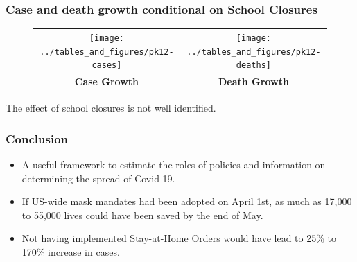 \documentclass{beamer}
\begin{document}
\begin{frame}
  \frametitle{Case and death growth conditional on \textbf{School Closures} }\vspace{-0.05cm}



\begin{figure}[ht]
  \begin{minipage}{\linewidth}
    \centering
    \begin{tabular}{cc}
       \texttt{[image: ../tables\_and\_figures/pk12-cases]}
      &
        \texttt{[image: ../tables\_and\_figures/pk12-deaths]}\\
    \textbf{Case Growth} &    \textbf{Death Growth} \\  
    \end{tabular}
  \end{minipage}
\end{figure}

The effect of school closures is not well identified. 


\end{frame}



\begin{frame}
  \frametitle{Conclusion }

\begin{itemize}
\item  A useful framework to estimate the roles of policies and information on determining the spread of Covid-19. \smallskip
 
\item  If US-wide mask mandates had been adopted on April 1st, as much as 17,000 to 55,000 lives could have been saved by the end of May.\smallskip

\item Not having implemented Stay-at-Home Orders would have lead to  25\% to 170\% increase in cases.\smallskip

%
%


\end{itemize}
 

\end{frame}
\end{document}
